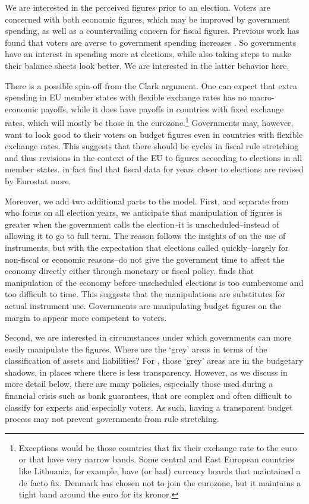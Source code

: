 \documentclass[]{article}
\begin{document}
We are interested in the perceived figures prior to an election. Voters are concerned with both economic figures, which may be improved by government spending, as well as a countervailing concern for fiscal figures. Previous work has found that voters are averse to government spending increases \citep[for a discussion see][]{deHaan2013}. So governments have an interest in spending more at elections, while also taking steps to make their balance sheets look better. We are interested in the latter behavior here.

There is a possible spin-off from the Clark argument. One can expect that extra spending in EU member states with flexible exchange rates has no macro-economic payoffs, while it does have payoffs in countries with fixed exchange rates, which will mostly be those in the eurozone.\footnote{Exceptions would be those countries that fix their exchange rate to the euro or that have very narrow bands. Some central and East European countries like Lithuania, for example, have (or had) currency boards that maintained a de facto fix. Denmark has chosen not to join the eurozone, but it maintains a tight band around the euro for its kronor.} Governments may, however, want to look good to their voters on budget figures even in countries with flexible exchange rates. This suggests that there should be cycles in fiscal rule stretching and thus revisions in the context of the EU to figures according to elections in all member states. \cite{DeCastro2013} in fact find that fiscal data for years closer to elections are revised by Eurostat more.

Moreover, we add two additional parts to the model. First, and separate from \cite{Alt2014} who focus on all election years, we anticipate that manipulation of figures is greater when the government calls the election--it is unscheduled--instead of allowing it to go to full term. The reason follows the insights of \cite{clark2003} on the use of instruments, but with the expectation that elections called quickly--largely for non-fiscal or economic reasons--do not give the government time to affect the economy directly either through monetary or fiscal policy. \cite{Kayser2005} finds that manipulation of the economy before unscheduled elections is too cumbersome and too difficult to time. This suggests that the manipulations are substitutes for actual instrument use. Governments are manipulating budget figures on the margin to appear more competent to voters.

Second, we are interested in circumstances under which governments can more easily manipulate the figures. Where are the `grey' areas in terms of the classification of assets and liabilities? For \cite{Alt2014}, those `grey' areas are in the budgetary shadows, in places where there is less transparency. However, as we discuss in more detail below, there are many policies, especially those used during a financial crisis such as bank guarantees, that are complex and often difficult to classify for  experts and especially voters. As such, having a transparent budget process may not prevent governments from rule stretching.
\end{document}
